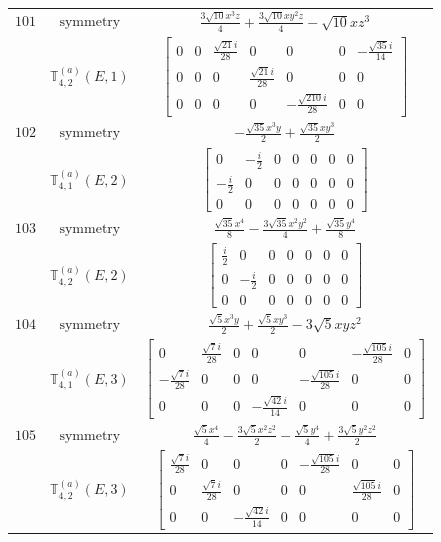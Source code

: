 \documentclass[fleqn,8pt,landscape]{jsarticle}
\begin{document}
\begin{longtable}{ccc}
$ 101 $ & $ \text{symmetry} $ & $ \frac{3 \sqrt{10} x^{3} z}{4} + \frac{3 \sqrt{10} x y^{2} z}{4} - \sqrt{10} x z^{3} $ \\
$  $ & $ \mathbb{T}_{4,2}^{(a)}(E,1) $ & $ \begin{bmatrix} 0 & 0 & \frac{\sqrt{21} i}{28} & 0 & 0 & 0 & - \frac{\sqrt{35} i}{14} \\ 0 & 0 & 0 & \frac{\sqrt{21} i}{28} & 0 & 0 & 0 \\ 0 & 0 & 0 & 0 & - \frac{\sqrt{210} i}{28} & 0 & 0 \end{bmatrix} $ \\ \hline
$ 102 $ & $ \text{symmetry} $ & $ - \frac{\sqrt{35} x^{3} y}{2} + \frac{\sqrt{35} x y^{3}}{2} $ \\
$  $ & $ \mathbb{T}_{4,1}^{(a)}(E,2) $ & $ \begin{bmatrix} 0 & - \frac{i}{2} & 0 & 0 & 0 & 0 & 0 \\ - \frac{i}{2} & 0 & 0 & 0 & 0 & 0 & 0 \\ 0 & 0 & 0 & 0 & 0 & 0 & 0 \end{bmatrix} $ \\ \hline
$ 103 $ & $ \text{symmetry} $ & $ \frac{\sqrt{35} x^{4}}{8} - \frac{3 \sqrt{35} x^{2} y^{2}}{4} + \frac{\sqrt{35} y^{4}}{8} $ \\
$  $ & $ \mathbb{T}_{4,2}^{(a)}(E,2) $ & $ \begin{bmatrix} \frac{i}{2} & 0 & 0 & 0 & 0 & 0 & 0 \\ 0 & - \frac{i}{2} & 0 & 0 & 0 & 0 & 0 \\ 0 & 0 & 0 & 0 & 0 & 0 & 0 \end{bmatrix} $ \\ \hline
$ 104 $ & $ \text{symmetry} $ & $ \frac{\sqrt{5} x^{3} y}{2} + \frac{\sqrt{5} x y^{3}}{2} - 3 \sqrt{5} x y z^{2} $ \\
$  $ & $ \mathbb{T}_{4,1}^{(a)}(E,3) $ & $ \begin{bmatrix} 0 & \frac{\sqrt{7} i}{28} & 0 & 0 & 0 & - \frac{\sqrt{105} i}{28} & 0 \\ - \frac{\sqrt{7} i}{28} & 0 & 0 & 0 & - \frac{\sqrt{105} i}{28} & 0 & 0 \\ 0 & 0 & 0 & - \frac{\sqrt{42} i}{14} & 0 & 0 & 0 \end{bmatrix} $ \\ \hline
$ 105 $ & $ \text{symmetry} $ & $ \frac{\sqrt{5} x^{4}}{4} - \frac{3 \sqrt{5} x^{2} z^{2}}{2} - \frac{\sqrt{5} y^{4}}{4} + \frac{3 \sqrt{5} y^{2} z^{2}}{2} $ \\
$  $ & $ \mathbb{T}_{4,2}^{(a)}(E,3) $ & $ \begin{bmatrix} \frac{\sqrt{7} i}{28} & 0 & 0 & 0 & - \frac{\sqrt{105} i}{28} & 0 & 0 \\ 0 & \frac{\sqrt{7} i}{28} & 0 & 0 & 0 & \frac{\sqrt{105} i}{28} & 0 \\ 0 & 0 & - \frac{\sqrt{42} i}{14} & 0 & 0 & 0 & 0 \end{bmatrix} $ \\ \hline

\end{longtable}
\end{document}
